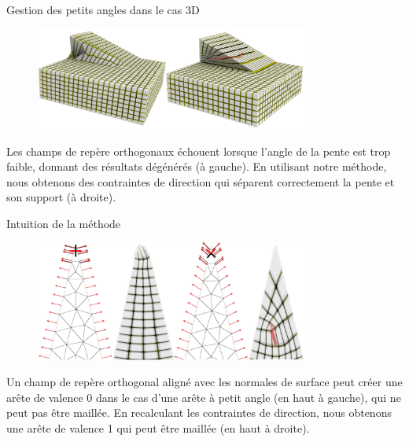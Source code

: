 \begin{frame}{Gestion des petits angles dans le cas 3D}

    \begin{figure}
        \centering
        \includegraphics[width=0.8\textwidth]{img/hexmeshing_ff/tremplin_solved_2.PNG}
    \end{figure}
    
    Les champs de repère orthogonaux échouent lorsque l'angle de la pente est trop faible, donnant des résultats dégénérés (à gauche). En utilisant notre méthode, nous obtenons des contraintes de direction qui séparent correctement la pente et son support (à droite).
    
\end{frame}

\begin{frame}{Intuition de la méthode}

    \begin{figure}
        \centering
        \includegraphics[width=0.8\textwidth]{img/hexmeshing_ff/normal_alignment_with_hexes_2.PNG}
    \end{figure}
    
    Un champ de repère orthogonal aligné avec les normales de surface peut créer une arête de valence 0 dans le cas d'une arête à petit angle (en haut à gauche), qui ne peut pas être maillée. En recalculant les contraintes de direction, nous obtenons une arête de valence 1 qui peut être maillée (en haut à droite).
    
\end{frame}

